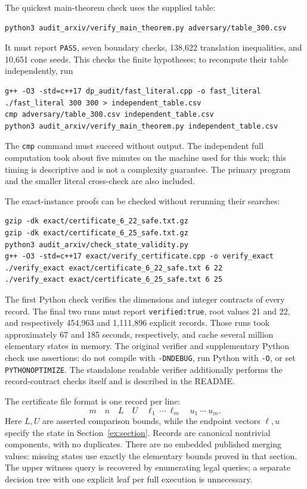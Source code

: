 \documentclass[11pt]{article}
\theoremstyle{definition}
\theoremstyle{remark}
\begin{document}
The quickest main-theorem check uses the supplied table:
\begin{lstlisting}
python3 audit_arxiv/verify_main_theorem.py adversary/table_300.csv
\end{lstlisting}
It must report \texttt{PASS}, seven boundary checks, 138,622 translation
inequalities, and 10,651 cone seeds. This checks the finite hypotheses; to
recompute their table independently, run
\begin{lstlisting}
g++ -O3 -std=c++17 dp_audit/fast_literal.cpp -o fast_literal
./fast_literal 300 300 > independent_table.csv
cmp adversary/table_300.csv independent_table.csv
python3 audit_arxiv/verify_main_theorem.py independent_table.csv
\end{lstlisting}
The \texttt{cmp} command must succeed without output. The independent
full computation took about five minutes on the machine used for this
work; this timing is descriptive and is not a complexity guarantee.
The primary program and the smaller literal cross-check are also included.

The exact-instance proofs can be checked without rerunning their searches:
\begin{lstlisting}
gzip -dk exact/certificate_6_22_safe.txt.gz
gzip -dk exact/certificate_6_25_safe.txt.gz
python3 audit_arxiv/check_state_validity.py
g++ -O3 -std=c++17 exact/verify_certificate.cpp -o verify_exact
./verify_exact exact/certificate_6_22_safe.txt 6 22
./verify_exact exact/certificate_6_25_safe.txt 6 25
\end{lstlisting}
The first Python check verifies the dimensions and integer contracts of
every record. The final two runs must report \texttt{verified:true},
root values 21 and 22, and respectively 454,963 and 1,111,896 explicit
records. Those runs took approximately 67 and 185 seconds, respectively,
and cache several million elementary states in memory. The original
verifier and supplementary Python check use assertions: do not compile
with \texttt{-DNDEBUG}, run Python with \texttt{-O}, or set
\texttt{PYTHONOPTIMIZE}. The standalone readable verifier additionally
performs the record-contract checks itself and is described in the README.

The certificate file format is one record per line:
\[
 m\quad n\quad L\quad U\quad
 \ell_1\ \cdots\ \ell_m\quad u_1\ \cdots\ u_m.
\]
Here $L,U$ are asserted comparison bounds, while the endpoint vectors
$\ell,u$ specify the state in Section~\ref{ex:section}. Records are
canonical nontrivial components, with no duplicates. There are no
embedded published merging values: missing states use exactly the
elementary bounds proved in that section. The upper witness query is
recovered by enumerating legal queries; a separate decision tree with
one explicit leaf per full execution is unnecessary.
\end{document}
